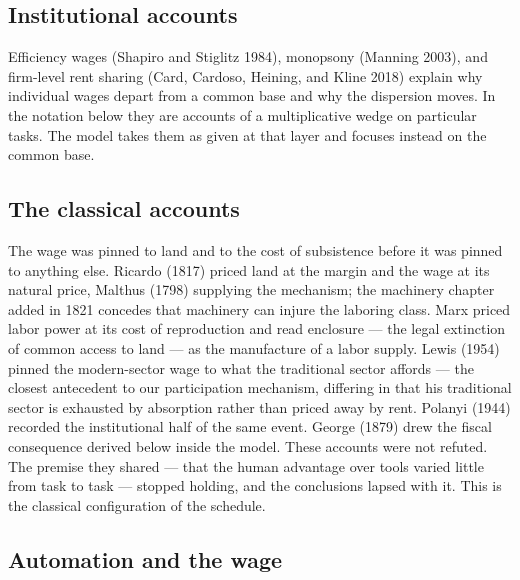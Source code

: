 \documentclass[12pt]{article}
\theoremstyle{plain}
\begin{document}
\subsection{Institutional accounts}\label{sec:institutions}

Efficiency wages (Shapiro and Stiglitz 1984), monopsony (Manning 2003), and firm-level rent sharing (Card, Cardoso, Heining, and Kline 2018) explain why individual wages depart from a common base and why the dispersion moves. In the notation below they are accounts of a multiplicative wedge on particular tasks. The model takes them as given at that layer and focuses instead on the common base.

\subsection{The classical accounts}\label{sec:classical}

The wage was pinned to land and to the cost of subsistence before it was pinned to anything else. Ricardo (1817) priced land at the margin and the wage at its natural price, Malthus (1798) supplying the mechanism; the machinery chapter added in 1821 concedes that machinery can injure the laboring class. Marx priced labor power at its cost of reproduction and read enclosure --- the legal extinction of common access to land --- as the manufacture of a labor supply. Lewis (1954) pinned the modern-sector wage to what the traditional sector affords --- the closest antecedent to our participation mechanism, differing in that his traditional sector is exhausted by absorption rather than priced away by rent. Polanyi (1944) recorded the institutional half of the same event. George (1879) drew the fiscal consequence derived below inside the model. These accounts were not refuted. The premise they shared --- that the human advantage over tools varied little from task to task --- stopped holding, and the conclusions lapsed with it. This is the classical configuration of the schedule.

\subsection{Automation and the wage}\label{sec:automation}
\end{document}
